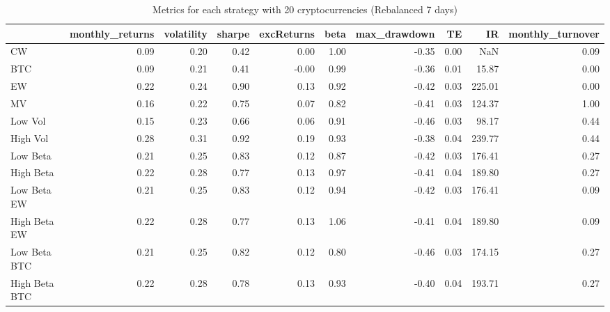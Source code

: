 \begin{table}
\centering
\caption{Metrics for each strategy with 20 cryptocurrencies (Rebalanced 7 days)}
\label{metrics20_7}
\begin{tabular}{lrrrrrrrrr}
\toprule
{} &  monthly\_returns &  volatility &  sharpe &  excReturns &  beta &  max\_drawdown &   TE &     IR &  monthly\_turnover \\
\midrule
CW            &             0.09 &        0.20 &    0.42 &        0.00 &  1.00 &         -0.35 & 0.00 &    NaN &              0.09 \\
BTC           &             0.09 &        0.21 &    0.41 &       -0.00 &  0.99 &         -0.36 & 0.01 &  15.87 &              0.00 \\
EW            &             0.22 &        0.24 &    0.90 &        0.13 &  0.92 &         -0.42 & 0.03 & 225.01 &              0.00 \\
MV            &             0.16 &        0.22 &    0.75 &        0.07 &  0.82 &         -0.41 & 0.03 & 124.37 &              1.00 \\
Low Vol       &             0.15 &        0.23 &    0.66 &        0.06 &  0.91 &         -0.46 & 0.03 &  98.17 &              0.44 \\
High Vol      &             0.28 &        0.31 &    0.92 &        0.19 &  0.93 &         -0.38 & 0.04 & 239.77 &              0.44 \\
Low Beta      &             0.21 &        0.25 &    0.83 &        0.12 &  0.87 &         -0.42 & 0.03 & 176.41 &              0.27 \\
High Beta     &             0.22 &        0.28 &    0.77 &        0.13 &  0.97 &         -0.41 & 0.04 & 189.80 &              0.27 \\
Low Beta EW   &             0.21 &        0.25 &    0.83 &        0.12 &  0.94 &         -0.42 & 0.03 & 176.41 &              0.09 \\
High Beta EW  &             0.22 &        0.28 &    0.77 &        0.13 &  1.06 &         -0.41 & 0.04 & 189.80 &              0.09 \\
Low Beta BTC  &             0.21 &        0.25 &    0.82 &        0.12 &  0.80 &         -0.46 & 0.03 & 174.15 &              0.27 \\
High Beta BTC &             0.22 &        0.28 &    0.78 &        0.13 &  0.93 &         -0.40 & 0.04 & 193.71 &              0.27 \\
\bottomrule
\end{tabular}
\end{table}
